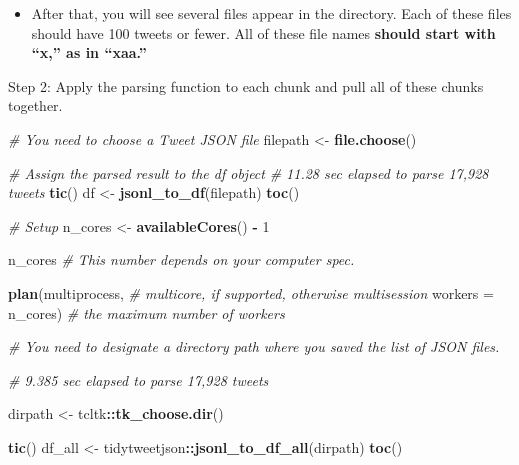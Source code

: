 \documentclass[
]{book}
\newenvironment{Shaded}{\begin{snugshade}}{\end{snugshade}}
\newcommand{\CommentTok}[1]{\textcolor[rgb]{0.56,0.35,0.01}{\textit{#1}}}
\newcommand{\DataTypeTok}[1]{\textcolor[rgb]{0.13,0.29,0.53}{#1}}
\newcommand{\DecValTok}[1]{\textcolor[rgb]{0.00,0.00,0.81}{#1}}
\newcommand{\KeywordTok}[1]{\textcolor[rgb]{0.13,0.29,0.53}{\textbf{#1}}}
\newcommand{\NormalTok}[1]{#1}
\newcommand{\OperatorTok}[1]{\textcolor[rgb]{0.81,0.36,0.00}{\textbf{#1}}}
\newcommand{\StringTok}[1]{\textcolor[rgb]{0.31,0.60,0.02}{#1}}
\providecommand{\tightlist}{%
  \setlength{\itemsep}{0pt}\setlength{\parskip}{0pt}}
\begin{document}
\begin{itemize}
\tightlist
\item
  After that, you will see several files appear in the directory. Each of these files should have 100 tweets or fewer. All of these file names \textbf{should start with ``x,'' as in ``xaa.''}
\end{itemize}

Step 2: Apply the parsing function to each chunk and pull all of these chunks together.

\begin{Shaded}
\begin{Highlighting}[]
\CommentTok{\# You need to choose a Tweet JSON file}
\NormalTok{filepath \textless{}{-}}\StringTok{ }\KeywordTok{file.choose}\NormalTok{()}

\CommentTok{\# Assign the parsed result to the \textasciigrave{}df\textasciigrave{} object}
\CommentTok{\# 11.28 sec elapsed to parse 17,928 tweets }
\KeywordTok{tic}\NormalTok{()}
\NormalTok{df \textless{}{-}}\StringTok{ }\KeywordTok{jsonl\_to\_df}\NormalTok{(filepath)}
\KeywordTok{toc}\NormalTok{()}
\end{Highlighting}
\end{Shaded}

\begin{Shaded}
\begin{Highlighting}[]
\CommentTok{\# Setup }
\NormalTok{n\_cores \textless{}{-}}\StringTok{ }\KeywordTok{availableCores}\NormalTok{() }\OperatorTok{{-}}\StringTok{ }\DecValTok{1}

\NormalTok{n\_cores }\CommentTok{\# This number depends on your computer spec.}

\KeywordTok{plan}\NormalTok{(multiprocess, }\CommentTok{\# multicore, if supported, otherwise multisession}
     \DataTypeTok{workers =}\NormalTok{ n\_cores) }\CommentTok{\# the maximum number of workers}

\CommentTok{\# You need to designate a directory path where you saved the list of JSON files.}

\CommentTok{\# 9.385 sec elapsed to parse 17,928 tweets }

\NormalTok{dirpath \textless{}{-}}\StringTok{ }\NormalTok{tcltk}\OperatorTok{::}\KeywordTok{tk\_choose.dir}\NormalTok{()}

\KeywordTok{tic}\NormalTok{()}
\NormalTok{df\_all \textless{}{-}}\StringTok{ }\NormalTok{tidytweetjson}\OperatorTok{::}\KeywordTok{jsonl\_to\_df\_all}\NormalTok{(dirpath)}
\KeywordTok{toc}\NormalTok{()}
\end{Highlighting}
\end{Shaded}
\end{document}

